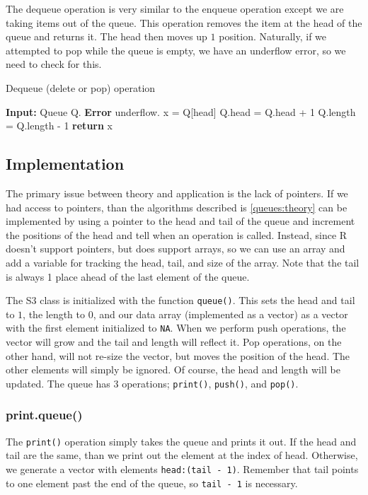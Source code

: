 \documentclass[11pt]{article}
\begin{document}
The dequeue operation is very similar to the enqueue operation except we are taking items out of the queue. This operation removes the item at the head of the queue and returns it. The head then moves up $1$ position. Naturally, if we attempted to pop while the queue is empty, we have an underflow error, so we need to check for this.
\begin{algorithm}[H]
    \caption{Dequeue (delete or pop) operation}
    \begin{algorithmic}[1]
        \State \textbf{Input: } Queue Q.
            \State \textbf{Error} underflow.
        \Else
            \State x = Q[head]
            \State Q.head = Q.head + 1
            \State Q.length = Q.length - 1
        \EndIf
        \State \textbf{return} x
    \end{algorithmic}
\end{algorithm}

\subsection{Implementation} \label{queues:implementation}
The primary issue between theory and application is the lack of pointers. If we had access to pointers, than the algorithms described is \ref{queues:theory} can be implemented by using a pointer to the head and tail of the queue and increment the positions of the head and tell when an operation is called. Instead, since R doesn't support pointers, but does support arrays, so we can use an array and add a variable for tracking the head, tail, and size of the array. Note that the tail is always 1 place ahead of the last element of the queue.

The S3 class is initialized with the function {\tt queue()}. This sets the head and tail to $1$, the length to $0$, and our data array (implemented as a vector) as a vector with the first element initialized to {\tt NA}. When we perform push operations, the vector will grow and the tail and length will reflect it. Pop operations, on the other hand, will not re-size the vector, but moves the position of the head. The other elements will simply be ignored. Of course, the head and length will be updated. The queue has $3$ operations; {\tt print()}, {\tt push()}, and {\tt pop()}.

\subsubsection{print.queue()}
The {\tt print()} operation simply takes the queue and prints it out. If the head and tail are the same, than we print out the element at the index of head. Otherwise, we generate a vector with elements {\tt head:(tail - 1)}. Remember that tail points to one element past the end of the queue, so {\tt tail - 1} is necessary.
\end{document}
